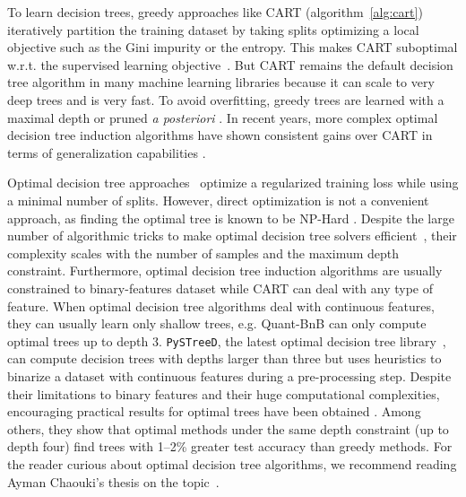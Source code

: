 To learn decision trees, greedy approaches like CART (algorithm~\ref{alg:cart}) iteratively partition the training dataset by taking splits optimizing a local objective such as the Gini impurity or the entropy. 
This makes CART suboptimal w.r.t. the supervised learning objective~\cite{lookahead}. 
But CART remains the default decision tree algorithm in many machine learning libraries \cite{scikit-learn,xgb,ke2017lightgbm,9533597} because it can scale to very deep trees and is very fast.
To avoid overfitting, greedy trees are learned with a maximal depth or pruned \textit{a posteriori} \cite[chapter 3]{breiman1984classification}. 
In recent years, more complex optimal decision tree induction algorithms have shown consistent gains over CART in terms of generalization capabilities \cite{oct,verwer2017learning,murtree}.

Optimal decision tree approaches~\cite{oct,mfoct,binoct,quantbnb,murtree,blossom,pystreed,chaouki2024branchesfastdynamicprogramming} optimize a regularized training loss while using a minimal number of splits.
However, direct optimization is not a convenient approach, as finding the optimal tree is known to be NP-Hard \cite{npcomplete}. Despite the large number of algorithmic tricks to make optimal decision tree solvers efficient~\cite{murtree,quantbnb}, their complexity scales with the number of samples and the maximum depth constraint.
Furthermore, optimal decision tree induction algorithms are usually constrained to binary-features dataset while CART can deal with any type of feature. When optimal decision tree algorithms deal with continuous features, they can usually learn only shallow trees, e.g. Quant-BnB \cite{quantbnb} can only compute optimal trees up to depth 3.
\texttt{PySTreeD}, the latest optimal decision tree library~\cite{pystreed}, can compute decision trees with depths larger than three but uses heuristics to binarize a dataset with continuous features during a pre-processing step. %
Despite their limitations to binary features and their huge computational complexities, encouraging practical results for optimal trees have been obtained \cite{how-eff,lin2020generalized,costa2023recent,vanderlinden2024optimalgreedydecisiontrees}.
Among others, they show that optimal methods under the same depth constraint (up to depth four) find
trees with 1--2\% greater test accuracy than greedy methods. For the reader curious about optimal decision tree algorithms, we recommend reading Ayman Chaouki's thesis on the topic~\cite[chapter 2]{ayman}.

